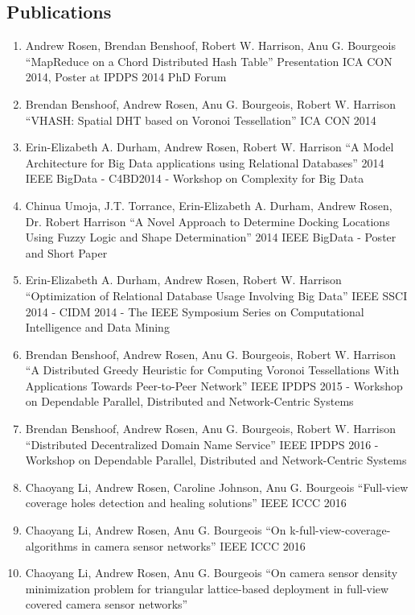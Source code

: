 \documentclass{res}
\begin{document}
\begin{resume}
\section{Publications}
	\begin{enumerate}
	\item Andrew Rosen, Brendan Benshoof, Robert W. Harrison, Anu G. Bourgeois
			``MapReduce on a Chord Distributed Hash Table''
			Presentation ICA CON 2014, Poster at IPDPS 2014 PhD Forum
	\item Brendan Benshoof, Andrew Rosen, Anu G. Bourgeois, Robert W. Harrison
			``VHASH: Spatial DHT based on Voronoi Tessellation''
			ICA CON 2014
	\item  Erin-Elizabeth A. Durham, Andrew Rosen, Robert W. Harrison
    ``A Model Architecture for Big Data applications using Relational Databases''
    2014 IEEE BigData - C4BD2014 - Workshop on Complexity for Big Data
    \item Chinua Umoja, J.T. Torrance, Erin-Elizabeth A. Durham, Andrew Rosen, Dr. Robert Harrison
    	``A Novel Approach to Determine Docking Locations Using Fuzzy Logic and Shape Determination''
    	2014 IEEE BigData - Poster and Short Paper
    \item  Erin-Elizabeth A. Durham, Andrew Rosen, Robert W. Harrison
    ``Optimization of Relational Database Usage Involving Big Data''
     IEEE SSCI 2014 - CIDM 2014 - The IEEE Symposium Series on Computational Intelligence and Data Mining
	\item Brendan Benshoof, Andrew Rosen, Anu G. Bourgeois, Robert W. Harrison
	 ``A Distributed Greedy Heuristic for Computing Voronoi Tessellations With Applications Towards Peer-to-Peer Network''
	IEEE IPDPS 2015 - Workshop on Dependable Parallel, Distributed and Network-Centric Systems
	\item Brendan Benshoof, Andrew Rosen, Anu G. Bourgeois, Robert W. Harrison
	``Distributed Decentralized Domain Name Service''
	IEEE IPDPS 2016 - Workshop on Dependable Parallel, Distributed and Network-Centric Systems
	\item Chaoyang Li, Andrew Rosen, Caroline Johnson, Anu G. Bourgeois 
	``Full-view coverage holes detection and healing solutions''
	IEEE ICCC 2016 
	\item Chaoyang Li, Andrew Rosen, Anu G. Bourgeois 
	``On k-full-view-coverage-algorithms in camera sensor networks''
	IEEE ICCC 2016 
	\item Chaoyang Li, Andrew Rosen, Anu G. Bourgeois
	``On camera sensor density minimization problem for triangular lattice-based deployment in full-view covered camera sensor networks'' 

\end{enumerate}
\end{resume}
\end{document}
